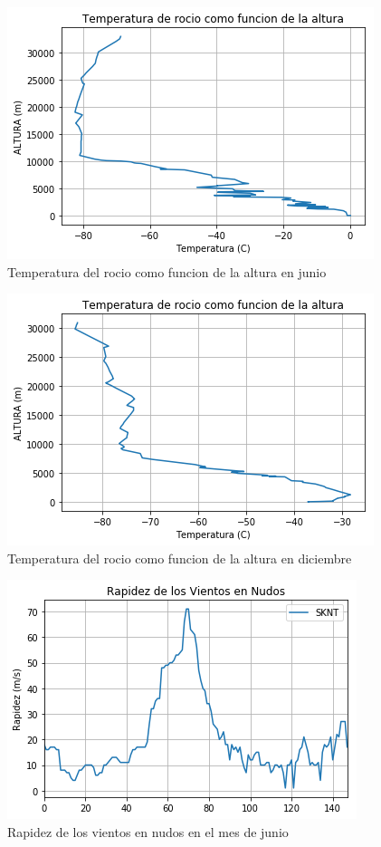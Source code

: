 \documentclass{article}
\begin{document}
\begin{figure}[h]
  \centering
  \includegraphics[scale=0.5]{rocioj.png}
  \caption{Temperatura del rocio como funcion de la altura en junio }
\end{figure}

\begin{figure}
  \centering
  \includegraphics[scale=0.5]{rociod.png}
  \caption{Temperatura del rocio como funcion de la altura en diciembre }
\end{figure}


\begin{figure}[h]
  \centering
  \includegraphics[scale=0.5]{nudosj.png}
  \caption{Rapidez de los vientos en nudos en el mes de junio}
\end{figure}
\end{document}
